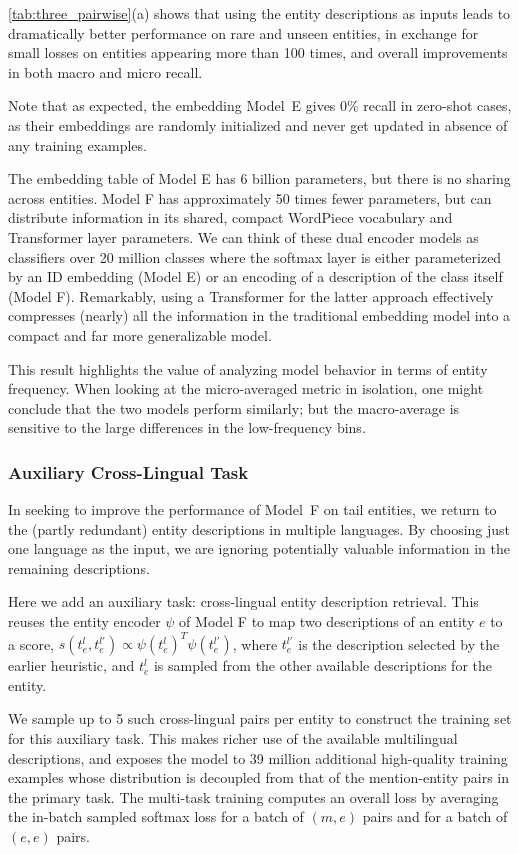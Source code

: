 \documentclass[11pt,a4paper]{article}
\begin{document}
\autoref{tab:three_pairwise}(a) shows that using the entity descriptions as inputs leads to dramatically better performance on rare and unseen entities, in exchange for small losses on entities appearing more than 100 times, and overall improvements in both macro and micro recall.

Note that as expected, the embedding Model~E
gives 0\% recall in zero-shot cases, 
as their embeddings are randomly
initialized and never get updated in absence of any training examples.

The embedding table of Model E has 6 billion parameters, but there is no sharing across entities.
Model F has approximately 50 times fewer parameters, but can distribute information in its shared, compact WordPiece vocabulary and Transformer layer parameters.
We can think of these dual encoder models as classifiers over 20 million classes where the softmax layer is either parameterized by an ID embedding (Model E) or an encoding of a description of the class itself (Model F).
Remarkably, using a Transformer for the latter approach effectively compresses (nearly) all the information in the traditional embedding model into a compact and far more generalizable model.

This result highlights the value of analyzing model behavior in terms of entity frequency.
When looking at the micro-averaged metric in isolation, one might conclude that the two models perform similarly;
but the macro-average is sensitive to the large differences in the low-frequency bins.


\subsubsection{Auxiliary Cross-Lingual Task}
In seeking to improve the performance of Model~F on tail entities, we return to the (partly redundant) entity descriptions in multiple languages.
By choosing just one language as the input, we are ignoring potentially valuable information in the remaining descriptions.

Here we add an auxiliary task: cross-lingual entity description retrieval.
This reuses the entity encoder $\psi$ of Model F to map two descriptions of an entity $e$ to a score, $s(t_e^l,t_e^{l'})\propto \psi(t_e^l)^T\psi(t_e^{l'})$,
where $t_e^{l'}$ is the description selected by the earlier heuristic,
and $t_e^l$ is sampled from the other available descriptions for the entity.

We sample up to 5 such cross-lingual pairs per entity to construct the training set for this auxiliary task.
This makes richer use of the available multilingual descriptions, and exposes the model to
39 million additional high-quality training examples whose distribution is decoupled from that of the mention-entity pairs in the primary task.
The multi-task training computes an overall loss by averaging the in-batch sampled softmax loss for a batch of $(m,e)$ pairs and for a batch of $(e,e)$ pairs.
\end{document}
